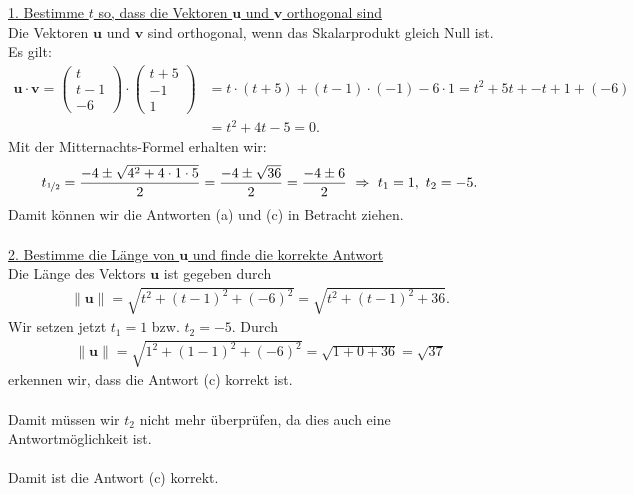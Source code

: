 \underline{1. Bestimme $ t $ so, dass die Vektoren $ \textbf{u} $ und $ \textbf{v} $ orthogonal sind}\\
Die Vektoren $ \textbf{u} $ und $ \textbf{v} $ sind orthogonal, wenn das Skalarprodukt gleich Null ist. Es gilt:
\begin{align*}
\textbf{u} \cdot \textbf{v}
=
\begin{pmatrix}
t \\ t-1 \\ -6
\end{pmatrix}
\cdot
\begin{pmatrix}
t+5 \\ -1 \\ 1
\end{pmatrix} 
&=
t\cdot(t+5) + (t-1)\cdot(-1)- 6 \cdot 1
=
t^2 + 5 t + -t +1 +(-6)\\
&=
t^2 +4t -5
=
0.
\end{align*}
Mit der Mitternachts-Formel erhalten wir:
\begin{align*}
t_{\nicefrac{1}{2}} = 
\frac{-4 \pm \sqrt{4^2 + 4 \cdot 1 \cdot  5}}{2}
=
\frac{-4 \pm \sqrt{36}}{2}
=
\frac{-4 \pm 6}{2}
\ \Rightarrow \
t_1 = 1, \ t_2 = -5.
\end{align*}
Damit können wir die Antworten (a) und (c) in Betracht ziehen.\\
\\
\underline{2. Bestimme die Länge von  $ \textbf{u} $ und finde die korrekte Antwort}\\
Die Länge des Vektors $ \textbf{u} $ ist gegeben durch
\begin{align*}
\| \textbf{u} \|
= \sqrt{t^2 + (t-1)^2 + (-6)^2}
= \sqrt{t^2 + (t-1)^2 + 36}.
\end{align*}
Wir setzen jetzt $ t_1 = 1$ bzw. $t_2 = -5 $.
Durch 
\begin{align*}
\| \textbf{u} \| = 
\sqrt{1^2 + (1-1)^2 + (-6)^2}
=
\sqrt{1 + 0 + 36 } 
=
\sqrt{37}
\end{align*}
erkennen wir, dass die Antwort (c) korrekt ist.\\
\\
Damit müssen wir $ t_2  $ nicht mehr überprüfen, da dies auch eine Antwortmöglichkeit ist.\\
\\
Damit ist die Antwort (c) korrekt.

\newpage
